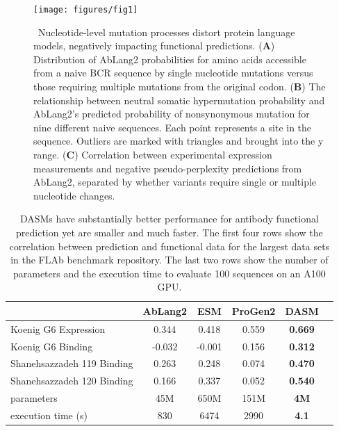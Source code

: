\documentclass{article}
\begin{document}
\begin{figure}[h!]
\centering
\centerline{\texttt{[image: figures/fig1]}}
\caption{\
Nucleotide-level mutation processes distort protein language models, negatively impacting functional predictions.
(\textbf{A}) Distribution of AbLang2 probabilities for amino acids accessible from a naive BCR sequence by single nucleotide mutations versus those requiring multiple mutations from the original codon.
(\textbf{B}) The relationship between neutral somatic hypermutation probability and AbLang2's predicted probability of nonsynonymous mutation for nine different naive sequences. Each point represents a site in the sequence.
Outliers are marked with triangles and brought into the y range.
(\textbf{C}) Correlation between experimental expression measurements and negative pseudo-perplexity predictions from AbLang2, separated by whether variants require single or multiple nucleotide changes.
}%
\label{fig:ntProcessInLLMs}
\end{figure}

\begin{table}[h!]
  \begin{center}
  \begin{tabular}{lccccc}
  & AbLang2 & ESM & ProGen2 & DASM \\
  \midrule
  Koenig G6 Expression & 0.344 & 0.418 & 0.559 & \textbf{0.669} \\
  Koenig G6 Binding & -0.032 & -0.001 & 0.156 & \textbf{0.312} \\
  Shanehsazzadeh 119 Binding & 0.263 & 0.248 & 0.074 & \textbf{0.470} \\
  Shanehsazzadeh 120 Binding & 0.166 & 0.337 & 0.052 & \textbf{0.540} \\
  \bottomrule
  parameters & 45M  & 650M & 151M & \textbf{4M} \\
  execution time (s) & 830 & 6474 & 2990 & \textbf{4.1} \\
  \bottomrule
  \end{tabular}
\end{center}
  \caption{%
  DASMs have substantially better performance for antibody functional prediction yet are smaller and much faster.
  The first four rows show the correlation between prediction and functional data for the largest data sets in the FLAb benchmark repository.
  The last two rows show the number of parameters and the execution time to evaluate 100 sequences on an A100 GPU.
  }
  \label{tab:model-comparison}
\end{table}
\end{document}
